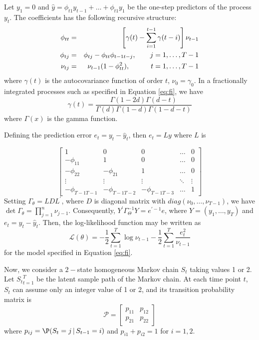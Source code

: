 \documentclass[11pt,fleqn]{article}
\begin{document}
Let $y_{1}=0$ and $\hat{y}=\phi _{t1}y_{t-1}+\ldots +\phi _{t1}y_{1}$ be the
one-step predictors of the process {$y_{t}$}. The coefficients has the
following recursive structure: 
\begin{eqnarray}
\phi _{tt} &=&\left[ \gamma (t)-\sum\limits_{i=1}^{t-1}\gamma (t-i)\right]
\nu _{t-1}  \notag \\
\phi _{tj} &=&\phi _{tj}-\phi _{tt}\phi _{t-1t-j},\qquad j=1,\ldots ,T-1 \\
\nu _{tj} &=&\nu _{t-1}(1-\phi _{tt}^{2}),\qquad \quad t=1,\ldots ,T-1 
\notag
\end{eqnarray}%
where $\gamma (t)$ is the autocovariance function of order $t$, $\nu
_{0}=\gamma _{0}$. In a fractionally integrated processes such as specified
in Equation \ref{eq:fi}, we have 
\begin{equation*}
\gamma (t)=\dfrac{\Gamma (1-2d)\Gamma (d-t)}{\Gamma (d)\Gamma (1-d)\Gamma
(1-d-t)}
\end{equation*}%
where $\Gamma (x)$ is the gamma function.

Defining the prediction error $e_t=y_t - \hat{y}_t $, then $e_t = Ly $ where 
$L $ is

\begin{equation}
\begin{bmatrix}
1 & 0 & 0 & \dots & 0 \\ 
-\phi_{11} & 1 & 0 & \dots & 0 \\ 
-\phi_{22} & -\phi_{21} & 1 & \dots & 0 \\ 
\vdots & \vdots & \vdots & \ddots & \vdots \\ 
-\phi_{T-1 T-1} & -\phi_{T-1 T-2} & -\phi_{T-1 T-3} & \dots & 1%
\end{bmatrix}
\label{eq:lev}
\end{equation}
Setting $\Gamma_\theta =LDL^{\prime }$, where $D $ is diagonal matrix with $%
diag(\nu_0,\ldots,\nu_{T-1}) $, we have $\det\Gamma_\theta= \prod_{j=1}^{n}
\nu_{j-1}$. Consequently, $Y^{\prime }\Gamma_\Theta^{-1} Y=e^{\prime -1}e$,
where $Y=(y_1,\ldots,y_T) $ and $e_t= y_t-\hat{y}_t$. Then, the
log-likelihood function may be written as 
\begin{equation}
\mathcal{L} (\theta) = -\dfrac{1}{2}\sum\limits_{t=1}^{T}\log\nu_{t-1} -%
\dfrac{1}{2}\sum\limits_{t=1}^{T} \dfrac{e^2_t}{\nu_{t-1}}
\end{equation}
for the model specified in Equation \ref{eq:fi}.

Now, we consider a $2 -$state homogeneous Markov chain $S_t $ taking values
1 or 2. Let ${S_t}^T_{t=1} $ be the latent sample path of the Markov chain.
At each time point $t $, $S_t $ can assume only an integer value of 1 or 2,
and its transition probability matrix is 
\begin{equation}
\mathcal{P} = \left[ 
\begin{matrix}
p_{11} & p_{12} \\ 
p_{21} & p_{22}%
\end{matrix}
\right]
\end{equation}
where $p_{ij} = \P (S_{t} = j \, | \, S_{t-1} = i) $ and $p_{i1}+p_{i2}=1 $
for $i=1,2 $.
\end{document}
